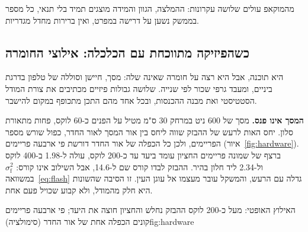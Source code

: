 מהמוקאפ עולים שלושה עקרונות: ההמלצה, הגוון והמידה מוצגים תמיד בלי תנאי, כל מספר בממשק נשען על דרישה במפרט, ואין ברירות מחדל מגדריות.

\subsection{כשהפיזיקה מתווכחת עם הכלכלה: אילוצי החומרה}
\label{sec:hardware}
 היא תוכנה, אבל היא רצה על חומרה שאינה שלה: מסך, חיישן וסוללה של טלפון בדרגת ביניים, ומעבד גרפי שכור לפי שנייה. שלושה גבולות פיזיים מכתיבים את צורת המודל הסטטיסטי ואת מבנה ההכנסות, ובכל אחד מהם התכן מתכופף במקום להישבר.

\textbf{המסך אינו פנס.} מסך של \num{600} ניט במרחק \num{30} ס"מ מטיל על הפנים כ-\num{60} לוקס, פחות מתאורת סלון. יחס האות לרעש של ההבזק שווה ליחס בין אור המסך לאור החדר, כפול שורש מספר הפריימים, ולכן כל הכפלה של אור החדר דורשת פי ארבעה פריימים (איור~\ref{fig:hardware}). ברצף של שמונה פריימים החציון עומד ביעד עד כ-\num{200} לוקס, עולה ל-\num{1.98} ב-\num{400} לוקס ול-\num{2.34} ליד חלון בהיר. ההבזק לבדו קורס שם ל-\num{14.6}, אבל השילוב אינו קורס: $\sigma^2_{\text{f}}$ במשוואה~\eqref{eq:flash} גדלה עם הרעש, והמשקל עובר מעצמו אל עוגן העין. זו הסיבה שהשונות היא חלק מהמודל, ולא קבוע שכויל פעם אחת.

\begin{reportfigure}{האילוץ האופטי: מעל כ-\num{200} לוקס ההבזק נחלש והחציון חוצה את היעד; פי ארבעה פריימים קונים הכפלה אחת של אור החדר (סימולציה)}{fig:hardware}
\end{reportfigure}

